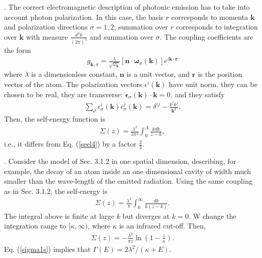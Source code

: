 \documentclass[12pt]{article}
\numberwithin{equation}{section}
\begin{document}
\begin{appendix}
 \bigskip

 . The correct electromagnetic description of photonic emission has to take into account photon polarization. In this case, the
basis $r$ corresponds to momenta ${\pmb k}$ and polarization directions $\sigma = 1, 2$; summation over $r$ corresponds to integration over ${\pmb k}$  with   measure $\frac{d^3k}{(2\pi)^3}$ and summation over $\sigma$. The coupling coefficients are the form
\begin{eqnarray}
g_{{\pmb k}, \sigma} = \frac{\lambda }{\sqrt{\omega_{\pmb k}}} [{\pmb n}\cdot{\pmb \omega}_{\sigma} ({\pmb k})]  e^{i {\pmb k}\cdot{\pmb r}}
\end{eqnarray}
 where $\lambda $ is a dimensionless constant, ${\pmb n}$ is a unit vector,  and ${\pmb r}$ is the position vector of the atom. The polarization vectors $\epsilon^i({\pmb k})$ have unit norm, they can be chosen to be real, they are transverse: ${\pmb \epsilon}_{\sigma} ({\pmb k})\cdot {\pmb k} = 0$, and they satisfy
 \begin{eqnarray}
 \sum_{\sigma} \epsilon^i_{\sigma}({\pmb k})  \epsilon^j_{\sigma}({\pmb k})  = \delta^{ij} - \frac{k^ik^j}{{\pmb k}^2}. \nonumber
 \end{eqnarray}
Then, the self-energy function is
   \begin{eqnarray}
   \Sigma (z) = \frac{\lambda^2}{3 \pi^2}  \int_0^{\Lambda} \frac{k  dk}{z-k},
  \end{eqnarray}
 i.e., it differs from Eq. (\ref{seel4}) by a factor $\frac{2}{3}$.


\bigskip

. Consider the model of Sec. 3.1.2 in one spatial dimension, describing, for example, the decay of an atom inside an one dimensional cavity of width much smaller than the wave-length of the emitted radiation. Using the same coupling as in Sec. 3.1.2, the self-energy is
\begin{eqnarray}
\Sigma(z) = \frac{\lambda^2}{\pi} \int_0^{\infty} \frac{dk}{k(z-k)}.
\end{eqnarray}
The integral above is finite at large $k$ but diverges at $k = 0$. W  change the integration range to $[\kappa, \infty)$, where $\kappa$ is an infrared cut-off. Then,
\begin{eqnarray}
\Sigma(z) = -\frac{\lambda^2}{\pi z} \ln \left(1 - \frac{z}{\kappa}\right). \label{sigma1s}
\end{eqnarray}
Eq. (\ref{sigma1s}) implies that $\Gamma(E) = 2\lambda^2/(\kappa + E)$.


\end{appendix}
\end{document}
